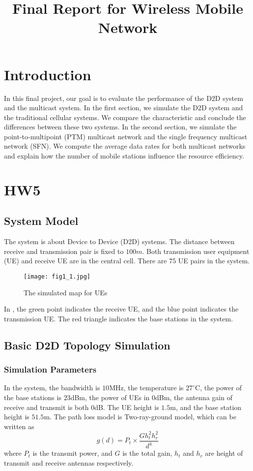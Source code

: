 \documentclass[conference]{IEEEtran}
\begin{document}
\title{Final Report for Wireless Mobile Network}
\author{
}
\maketitle

\section{Introduction}
In this final project, our goal is to evaluate the performance of the D2D system and the multicast system. In the first section, we simulate the D2D system and the traditional cellular systems. We compare the characteristic and conclude the differences between these two systems. In the second section, we simulate the point-to-multipoint (PTM) multicast network and the single frequency multicast network (SFN). We compute the average data rates for both multicast networks and explain how the number of mobile stations influence the resource efficiency.
\section{HW5}
\subsection{System Model}
The system is about Device to Device (D2D) systems. The distance between receive and transmission pair is fixed to $100m$. Both transmission user equipment (UE) and receive UE are in the central cell. There are $75$ UE pairs in the system.
\begin{figure}[htbp]
    \centering
    \texttt{[image: fig1\_1.jpg]}
    \caption{The simulated map for UEs}
    \label{fig:ue_map}
\end{figure}


In , the green point indicates the receive UE, and the blue point indicates the transmission UE. The red triangle indicates the base stations in the system.
\subsection{Basic D2D Topology Simulation}
\subsubsection{Simulation Parameters}
In the system, the bandwidth is $10$MHz, the temperature is $27^\circ$C, the power of the base stations is $23$dBm, the power of UEs in $0$dBm, the antenna gain of receive and transmit is both $0$dB. The UE height is $1.5$m, and the base station height is $51.5$m. The path loss model is Two-ray-ground model, which can be written as
\begin{equation}\label{eqn:two_ray}
    g(d) = P_t \times \dfrac{Gh_t^2h_r^2}{d^4}
\end{equation}
where $P_t$ is the transmit power, and $G$ is the total gain, $h_t$ and $h_r$ are height of transmit and receive antennas respectively.
\end{document}
